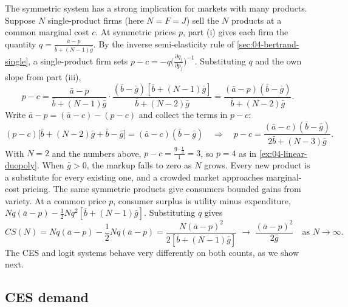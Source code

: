  The symmetric system has a strong implication for markets with many products.
Suppose $N$ single-product firms (here $N = F = J$) sell the $N$ products at a common marginal cost $c$. At
symmetric prices $p$, part (i) gives each firm the quantity $q = \frac{\bar a - p}{\bar b + (N-1)\bar g}$. By the
inverse semi-elasticity rule of \cref{sec:04-bertrand-single}, a single-product firm sets
$p - c = -q\big(\frac{\partial q_j}{\partial p_j}\big)^{-1}$. Substituting $q$ and the own slope from part (iii),
\begin{equation*}
p - c = \frac{\bar a - p}{\bar b + (N-1)\bar g}\cdot\frac{(\bar b - \bar g)[\bar b + (N-1)\bar g]}{\bar b + (N-2)\bar g}
= \frac{(\bar a - p)(\bar b - \bar g)}{\bar b + (N-2)\bar g}.
\end{equation*}
Write $\bar a - p = (\bar a - c) - (p - c)$ and collect the terms in $p - c$:
\begin{equation}\label{eq:04-linear-symmetric}
(p - c)\big[\bar b + (N-2)\bar g + \bar b - \bar g\big] = (\bar a - c)(\bar b - \bar g)
\quad\Longrightarrow\quad
p - c = \frac{(\bar a - c)(\bar b - \bar g)}{2\bar b + (N-3)\bar g}.
\end{equation}
With $N = 2$ and the numbers above, $p - c = \frac{9 \cdot \frac{1}{3}}{1} = 3$, so $p = 4$ as in
\cref{ex:04-linear-duopoly}. When $\bar g > 0$, the markup falls to zero as $N$ grows. Every new product is a
substitute for every existing one, and a crowded market approaches marginal-cost pricing. The same symmetric
products give consumers bounded gains from variety. At a common price $p$, consumer surplus is utility minus
expenditure, $Nq(\bar a - p) - \frac{1}{2}Nq^2[\bar b + (N-1)\bar g]$. Substituting $q$ gives
\begin{equation*}
CS(N) = Nq(\bar a - p) - \frac{1}{2}Nq(\bar a - p) = \frac{N(\bar a - p)^2}{2[\bar b + (N-1)\bar g]}
\;\longrightarrow\; \frac{(\bar a - p)^2}{2\bar g} \quad \text{as } N \to \infty .
\end{equation*}
The CES and logit systems behave very differently on both counts, as we show next.

\subsection{CES demand}\label{sec:04-repcons-ces}

